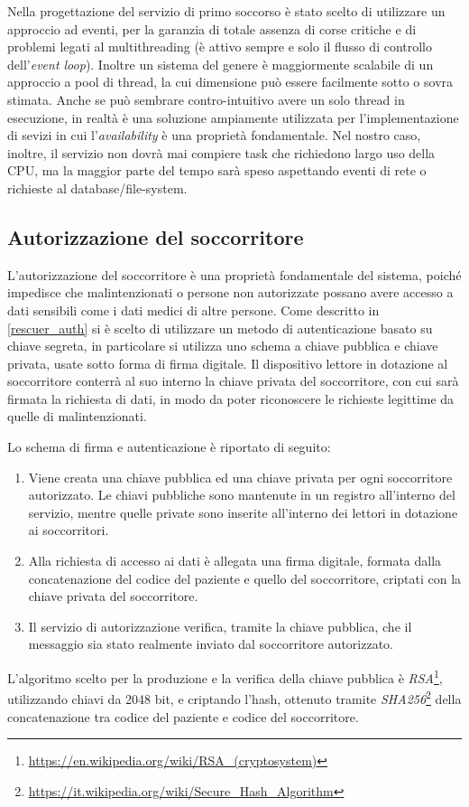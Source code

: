 \documentclass[a4paper,12pt]{report}
\begin{document}
Nella progettazione del servizio di primo soccorso è stato scelto di utilizzare un approccio ad eventi, per la garanzia di totale assenza di corse critiche e di problemi legati al multithreading (è attivo sempre e solo il flusso di controllo dell'\emph{event loop}). Inoltre un sistema del genere è maggiormente scalabile di un approccio a pool di thread, la cui dimensione può essere facilmente sotto o sovra stimata. Anche se può sembrare contro-intuitivo avere un solo thread in esecuzione, in realtà è una soluzione ampiamente utilizzata per l'implementazione di sevizi in cui l'\emph{availability} è una proprietà fondamentale. Nel nostro caso, inoltre, il servizio non dovrà mai compiere task che richiedono largo uso della CPU, ma la maggior parte del tempo sarà speso aspettando eventi di rete o richieste al database/file-system. 

\subsection{Autorizzazione del soccorritore}
L'autorizzazione del soccorritore è una proprietà fondamentale del sistema, poiché impedisce che malintenzionati o persone non autorizzate possano avere accesso a dati sensibili come i dati medici di altre persone. Come descritto in \autoref{rescuer_auth} si è scelto di utilizzare un metodo di autenticazione basato su chiave segreta, in particolare si utilizza uno schema a chiave pubblica e chiave privata, usate sotto forma di firma digitale. Il dispositivo lettore in dotazione al soccorritore conterrà al suo interno la chiave privata del soccorritore, con cui sarà firmata la richiesta di dati, in modo da poter riconoscere le richieste legittime da quelle di malintenzionati. 

Lo schema di firma e autenticazione è riportato di seguito:
\begin{enumerate}
	\item Viene creata una chiave pubblica ed una chiave privata per ogni soccorritore autorizzato. Le chiavi pubbliche sono mantenute in un registro all'interno del servizio, mentre quelle private sono inserite all'interno dei lettori in dotazione ai soccorritori.
	\item Alla richiesta di accesso ai dati è allegata una firma digitale, formata dalla concatenazione del codice del paziente e quello del soccorritore, criptati con la chiave privata del soccorritore.
	\item Il servizio di autorizzazione verifica, tramite la chiave pubblica, che il messaggio sia stato realmente inviato dal soccorritore autorizzato.
\end{enumerate}
L'algoritmo scelto per la produzione e la verifica della chiave pubblica è \emph{RSA}\footnote{\url{https://en.wikipedia.org/wiki/RSA_(cryptosystem)}}, utilizzando chiavi da 2048 bit, e criptando l'hash, ottenuto tramite \emph{SHA256}\footnote{\url{https://it.wikipedia.org/wiki/Secure_Hash_Algorithm}} della concatenazione tra codice del paziente e codice del soccorritore. 
\end{document}
